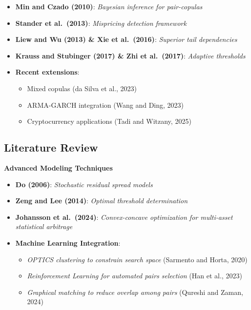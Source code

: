 \documentclass[
  letterpaper,
  DIV=11,
  numbers=noendperiod]{scrartcl}
\providecommand{\tightlist}{%
  \setlength{\itemsep}{0pt}\setlength{\parskip}{0pt}}\usepackage{longtable,booktabs,array}
\begin{document}
\begin{itemize}
\tightlist
\item
  \textbf{Min and Czado (2010)}: \emph{Bayesian inference for
  pair-copulas}
\item
  \textbf{Stander et al.~(2013)}: \emph{Mispricing detection framework}
\item
  \textbf{Liew and Wu (2013) \& Xie et al.~(2016)}: \emph{Superior tail
  dependencies}
\item
  \textbf{Krauss and Stubinger (2017) \& Zhi et al.~(2017)}:
  \emph{Adaptive thresholds}
\item
  \textbf{Recent extensions}:

  \begin{itemize}
  \tightlist
  \item
    Mixed copulas (da Silva et al., 2023)
  \item
    ARMA-GARCH integration (Wang and Ding, 2023)
  \item
    Cryptocurrency applications (Tadi and Witzany, 2025)
  \end{itemize}
\end{itemize}

\subsection{Literature Review}\label{literature-review-3}

{\textbf{Advanced Modeling Techniques}}

\begin{itemize}
\tightlist
\item
  \textbf{Do (2006)}: \emph{Stochastic residual spread models}
\item
  \textbf{Zeng and Lee (2014)}: \emph{Optimal threshold determination}
\item
  \textbf{Johansson et al.~(2024)}: \emph{Convex-concave optimization
  for multi-asset statistical arbitrage}
\item
  \textbf{Machine Learning Integration}:

  \begin{itemize}
  \tightlist
  \item
    \emph{OPTICS clustering to constrain search space} (Sarmento and
    Horta, 2020)
  \item
    \emph{Reinforcement Learning for automated pairs selection} (Han et
    al., 2023)
  \item
    \emph{Graphical matching to reduce overlap among pairs} (Qureshi and
    Zaman, 2024)
  \end{itemize}
\end{itemize}
\end{document}
